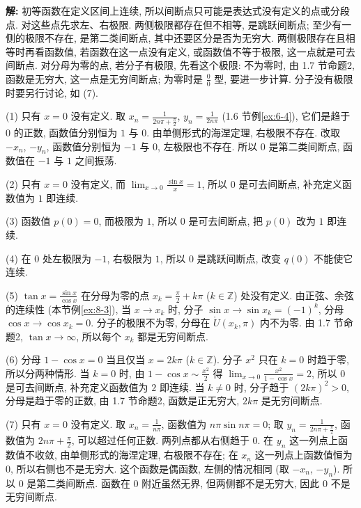\documentclass[UTF8,openany]{ctexbook}
\theoremstyle{chinesetextbook}
\newenvironment{cnsolution}{\par\indent\textbf{解:} \ignorespaces}{\par}
\begin{document}
\begin{cnsolution}
初等函数在定义区间上连续, 所以间断点只可能是表达式没有定义的点或分段点. 对这些点先求左、右极限. 两侧极限都存在但不相等, 是跳跃间断点; 至少有一侧的极限不存在, 是第二类间断点, 其中还要区分是否为无穷大. 两侧极限存在且相等时再看函数值, 若函数在这一点没有定义, 或函数值不等于极限, 这一点就是可去间断点. 对分母为零的点, 若分子有极限, 先看这个极限: 不为零时, 由 1.7 节命题2, 函数是无穷大, 这一点是无穷间断点; 为零时是 $\displaystyle\frac00$ 型, 要进一步计算. 分子没有极限时要另行讨论, 如 (7).

(1) 只有 $x=0$ 没有定义. 取 $\displaystyle x_n=\frac1{2n\pi+\frac\pi2}$, $\displaystyle y_n=\frac1{2n\pi}$ (1.6 节例\ref{ex:6-4}), 它们是趋于 $0$ 的正数, 函数值分别恒为 $1$ 与 $0$. 由单侧形式的海涅定理, 右极限不存在. 改取 $-x_n$, $-y_n$, 函数值分别恒为 $-1$ 与 $0$, 左极限也不存在. 所以 $0$ 是第二类间断点, 函数值在 $-1$ 与 $1$ 之间振荡.

(2) 只有 $x=0$ 没有定义, 而 $\displaystyle\lim_{x\to0}\frac{\sin x}x=1$, 所以 $0$ 是可去间断点, 补充定义函数值为 $1$ 即连续.

(3) 函数值 $p(0)=0$, 而极限为 $1$, 所以 $0$ 是可去间断点, 把 $p(0)$ 改为 $1$ 即连续.

(4) 在 $0$ 处左极限为 $-1$, 右极限为 $1$, 所以 $0$ 是跳跃间断点, 改变 $q(0)$ 不能使它连续.

(5) $\displaystyle\tan x=\frac{\sin x}{\cos x}$ 在分母为零的点 $\displaystyle x_k=\frac\pi2+k\pi$ ($k\in\mathbb Z$) 处没有定义. 由正弦、余弦的连续性 (本节例\ref{ex:8-3}), 当 $x\to x_k$ 时, 分子 $\sin x\to\sin x_k=(-1)^k$, 分母 $\cos x\to\cos x_k=0$. 分子的极限不为零, 分母在 $\mathring U(x_k,\pi)$ 内不为零. 由 1.7 节命题2, $\tan x\to\infty$, 所以每个 $x_k$ 都是无穷间断点.

(6) 分母 $1-\cos x=0$ 当且仅当 $x=2k\pi$ ($k\in\mathbb Z$). 分子 $x^2$ 只在 $k=0$ 时趋于零, 所以分两种情形. 当 $k=0$ 时, 由 $\displaystyle1-\cos x\sim\frac{x^2}2$ 得 $\displaystyle\lim_{x\to0}\frac{x^2}{1-\cos x}=2$, 所以 $0$ 是可去间断点, 补充定义函数值为 $2$ 即连续. 当 $k\ne0$ 时, 分子趋于 $(2k\pi)^2>0$, 分母是趋于零的正数, 由 1.7 节命题2, 函数是正无穷大, $2k\pi$ 是无穷间断点.

(7) 只有 $x=0$ 没有定义. 取 $\displaystyle x_n=\frac1{n\pi}$, 函数值为 $n\pi\sin n\pi=0$; 取 $\displaystyle y_n=\frac1{2n\pi+\frac\pi2}$, 函数值为 $\displaystyle2n\pi+\frac\pi2$, 可以超过任何正数. 两列点都从右侧趋于 $0$. 在 $y_n$ 这一列点上函数值不收敛, 由单侧形式的海涅定理, 右极限不存在; 在 $x_n$ 这一列点上函数值恒为 $0$, 所以右侧也不是无穷大. 这个函数是偶函数, 左侧的情况相同 (取 $-x_n$, $-y_n$). 所以 $0$ 是第二类间断点. 函数在 $0$ 附近虽然无界, 但两侧都不是无穷大, 因此 $0$ 不是无穷间断点.
\end{cnsolution}
\end{document}
